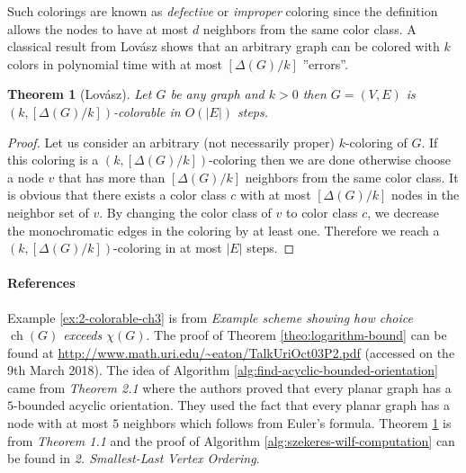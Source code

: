 \documentclass[a4paper, 12pt]{article}
\newtheorem{theo}[lem]{Theorem}
\DeclareMathOperator*{\ch}{ch}
\begin{document}
Such colorings are known as \textit{defective} or \textit{improper} coloring since the definition allows the nodes to have at most $d$ neighbors from the same color class.
A classical result from Lovász shows that an arbitrary graph can be colored with $k$ colors in polynomial time with at most $[\Delta(G)/k]$ ''errors''.
\begin{theo}[Lovász]\label{theo:lovasz-defective}
Let $G$ be any graph and $k > 0$ then $G=(V,E)$ is $(k,[\Delta(G)/k])$-colorable in $O(|E|)$ steps.
\end{theo}
\begin{proof} Let us consider an arbitrary (not necessarily proper) $k$-coloring of $G$. If this coloring is a $(k,[\Delta(G)/k])$-coloring then we are done otherwise choose a node $v$ that has more than $[\Delta(G)/k]$ neighbors from the same color class. It is obvious that there exists a color class $c$ with at most $[\Delta(G)/k]$ nodes in the neighbor set of $v$. By changing the color class of $v$ to color class $c$, we decrease the monochromatic edges in the coloring by at least one. Therefore we reach a $(k,[\Delta(G)/k])$-coloring in at most $|E|$ steps.
\end{proof}

\paragraph*{References} Example \ref{ex:2-colorable-ch3} is from \cite{erdos-choosability} \textit{Example scheme showing how choice $\ch(G)$ exceeds $\chi(G)$}. The proof of Theorem \ref{theo:logarithm-bound} can be found at \url{http://www.math.uri.edu/~eaton/TalkUriOct03P2.pdf} (accessed on the 9th March 2018). The idea of Algorithm \ref{alg:find-acyclic-bounded-orientation} came from \cite{CHROBAK1991243} \textit{Theorem 2.1} where the authors proved that every planar graph has a $5$-bounded acyclic orientation. They used the fact that every planar graph has a node with at most $5$ neighbors which follows from Euler's formula. Theorem \ref{theo:lovasz-defective} is from \cite{Cowen:1997:CD:314161.314387} \textit{Theorem 1.1} and the proof of Algorithm \ref{alg:szekeres-wilf-computation} can be found in \cite{Matula:1983:SOC:2402.322385} \textit{2. Smallest-Last Vertex Ordering}.
\end{document}
